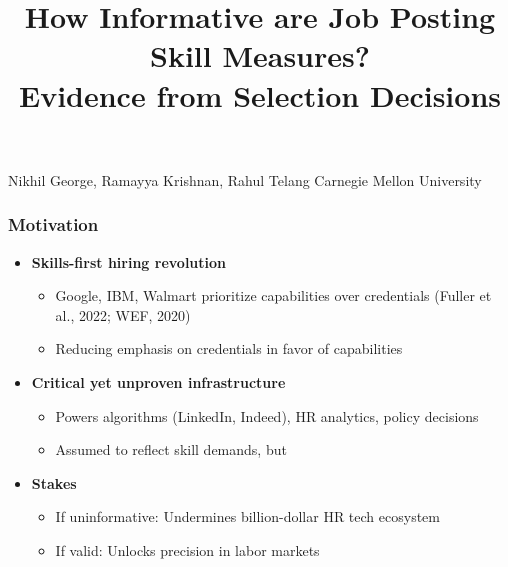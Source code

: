 \documentclass[11pt,xcolor={dvipsnames},hyperref={pdftex,pdfpagemode=UseNone,hidelinks,pdfdisplaydoctitle=true},usepdftitle=false]{beamer}
\begin{document}
\title{How Informative are Job Posting Skill Measures?\\
Evidence from Selection Decisions}

\information
%
%
{Nikhil George, Ramayya Krishnan, Rahul Telang}
%
{Carnegie Mellon University}

\frame{\titlepage}


\begin{frame}
\frametitle{Motivation}
\begin{itemize}
\item \textbf{Skills-first hiring revolution}
  \begin{itemize}
  \item Google, IBM, Walmart prioritize capabilities over credentials (Fuller et al., 2022; WEF, 2020)
  \item Reducing emphasis on credentials in favor of capabilities
  \end{itemize}

\item \textbf{Critical yet unproven infrastructure}
  \begin{itemize}
  \item Powers algorithms (LinkedIn, Indeed), HR analytics, policy decisions
  \item Assumed to reflect skill demands, but 
  \end{itemize}

\item \textbf{Stakes}
  \begin{itemize}
  \item If uninformative: Undermines billion-dollar HR tech ecosystem
  \item If valid: Unlocks precision in labor markets
  \end{itemize}
\end{itemize}
\end{frame}
\end{document}
